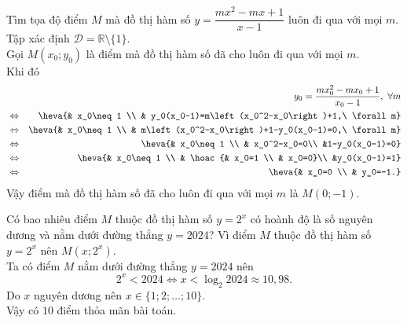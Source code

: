 \begin{bt}%
Tìm tọa độ điểm $M$ mà đồ thị hàm số $y=\dfrac{mx^2-mx+1}{x-1}$ luôn đi qua với mọi $m$.
\loigiai
{Tập xác định $\mathscr{D}=\mathbb{R}\setminus\{1\}$.\\
Gọi $M(x_0;y_0)$ là điểm mà đồ thị hàm số đã cho luôn đi qua với mọi $m$.\\
Khi đó \begin{eqnarray*}
&&y_0=\dfrac{mx_0^2-mx_0+1}{x_0-1},\ \forall m\\
&\Leftrightarrow & \heva{& x_0\neq 1 \\ & y_0(x_0-1)=m\left(x_0^2-x_0\right)+1,\ \forall m}\\
&\Leftrightarrow & \heva{& x_0\neq 1 \\ & m\left(x_0^2-x_0\right)+1-y_0(x_0-1)=0,\ \forall m}\\
&\Leftrightarrow &\heva{& x_0\neq 1 \\ & x_0^2-x_0=0\\ &1-y_0(x_0-1)=0}\\
&\Leftrightarrow & \heva{& x_0\neq 1 \\ & \hoac{& x_0=1 \\ & x_0=0}\\ &y_0(x_0-1)=1}\\
&\Leftrightarrow &\heva{& x_0=0 \\ & y_0=-1.}
\end{eqnarray*}
Vậy điểm mà đồ thị hàm số đã cho luôn đi qua với mọi $m$ là $M(0;-1)$.
}
\end{bt}

\begin{bt}%
Có bao nhiêu điểm $M$ thuộc đồ thị hàm số $y=2^x$ có hoành độ là số nguyên dương và nằm dưới đường thẳng $y=2024$?
\loigiai
{Vì điểm $M$ thuộc đồ thị hàm số $y=2^x$ nên $M\left(x;2^x\right)$.\\
Ta có điểm $M$ nằm dưới đường thẳng $y=2024$ nên \[2^x<2024\Leftrightarrow x<\log_2 2024\approx 10{,}98.\]
Do $x$ nguyên dương nên $x\in\{1;2;\ldots;10\}$.\\
Vậy có $10$ điểm thỏa mãn bài toán.
}
\end{bt}

